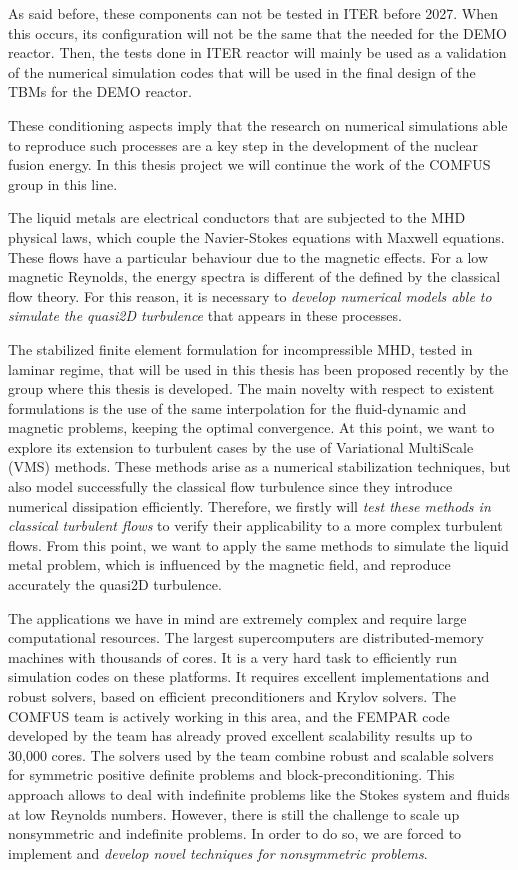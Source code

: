 As said before, these components can not be tested in ITER before 2027. When this occurs, its configuration will not be the same that the needed for the DEMO reactor. Then, the tests done in ITER reactor will mainly be used as a validation of the numerical simulation codes that will be used in the final design of the TBMs for the DEMO reactor.

These conditioning aspects imply that the research on numerical simulations able to reproduce such processes are a key step in the development of the nuclear fusion energy. In this thesis project we will continue the work of the COMFUS group in this line.

The liquid metals are electrical conductors that are subjected to the MHD physical laws, which couple the Navier-Stokes equations with Maxwell equations. These flows have a particular behaviour due to the magnetic effects. For a low magnetic Reynolds, the energy spectra is different of the defined by the classical flow theory. For this reason, it is necessary to \emph{develop numerical models able to simulate the quasi2D turbulence} that appears in these processes.

The stabilized finite element formulation for incompressible MHD, tested in laminar regime, that will be used in this thesis has been proposed recently by the group where this thesis is developed. The main novelty with respect to existent formulations is the use of the same interpolation for the fluid-dynamic and magnetic problems, keeping the optimal convergence. At this point, we want to explore its extension to turbulent cases by the use of Variational MultiScale (VMS) methods. These methods arise as a numerical stabilization techniques, but also model successfully the classical flow turbulence since they introduce numerical dissipation efficiently. Therefore, we firstly will \emph{test these methods in classical turbulent flows} to verify their applicability to a more complex turbulent flows. From this point, we want to apply the same methods to simulate the liquid metal problem, which is influenced by the magnetic field, and reproduce accurately the quasi2D turbulence.

The applications we have in mind are extremely complex and require large computational resources. The largest supercomputers are distributed-memory machines with thousands of cores. It is a very hard task to efficiently run simulation codes on these platforms. It requires excellent implementations and robust solvers, based on efficient preconditioners and Krylov solvers. The COMFUS team is actively working in this area, and the FEMPAR code developed by the team has already proved excellent scalability results up to 30,000 cores. The solvers used by the team combine robust and scalable solvers for symmetric positive definite problems and block-preconditioning. This approach allows to deal with indefinite problems like the Stokes system and fluids at low Reynolds numbers. However, there is still the challenge to scale up nonsymmetric and indefinite problems. In order to do so, we are forced to implement and \emph{develop novel techniques for nonsymmetric problems}.

